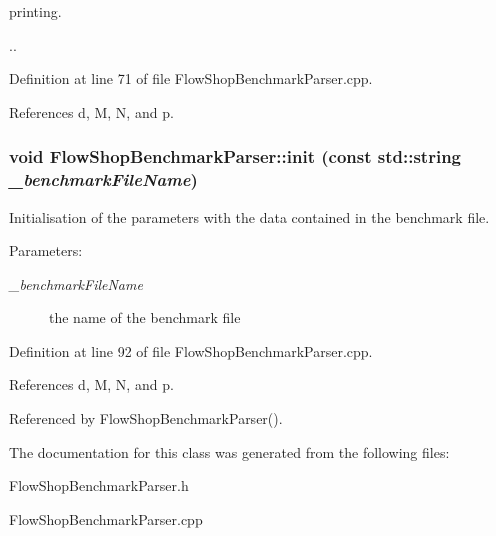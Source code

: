 printing. 

.. 

Definition at line 71 of file Flow\-Shop\-Benchmark\-Parser.cpp.

References d, M, N, and p.
\subsubsection{\setlength{\rightskip}{0pt plus 5cm}void Flow\-Shop\-Benchmark\-Parser::init (const std::string {\em \_\-benchmark\-File\-Name})\hspace{0.3cm}{\tt  [private]}}\label{classFlowShopBenchmarkParser_4e6de6a0ec2859e1a2fb758fb06dc915}


Initialisation of the parameters with the data contained in the benchmark file. 

\begin{Desc}
\item[Parameters:]
\begin{description}
\item[{\em \_\-benchmark\-File\-Name}]the name of the benchmark file \end{description}
\end{Desc}


Definition at line 92 of file Flow\-Shop\-Benchmark\-Parser.cpp.

References d, M, N, and p.

Referenced by Flow\-Shop\-Benchmark\-Parser().

The documentation for this class was generated from the following files:\begin{CompactItemize}
\item 
Flow\-Shop\-Benchmark\-Parser.h\item 
Flow\-Shop\-Benchmark\-Parser.cpp\end{CompactItemize}
